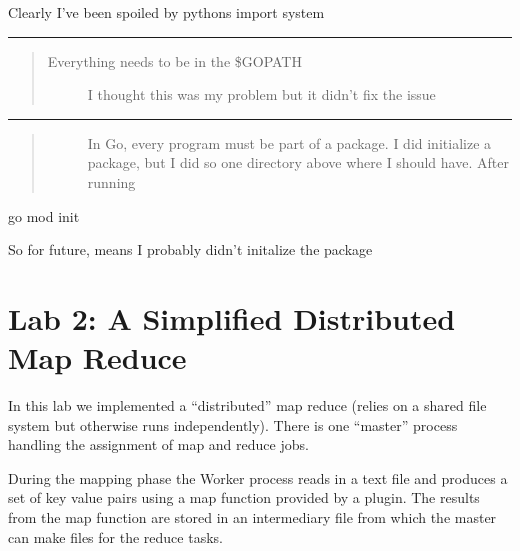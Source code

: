 \documentclass[letterpaper,10pt,english]{sphinxmanual}
\begin{document}
Clearly I’ve been spoiled by pythons import system


\bigskip\hrule\bigskip

\begin{quote}\begin{description}
\item[{Everything needs to be in the \$GOPATH}] \leavevmode
I thought this was my problem but it didn’t fix the issue

\end{description}\end{quote}


\bigskip\hrule\bigskip

\begin{quote}\begin{description}
\item[{}] \leavevmode
In Go,  every program must be part of a package. I did initialize a package, but I
did so one directory above where I should have. After running

\end{description}\end{quote}
\def\sphinxLiteralBlockLabel{\label{\detokenize{grpc/grpc:id4}}}
\begin{sphinxVerbatim}[commandchars=\\\{\}]
\PYGZdl{} go mod init
\end{sphinxVerbatim}

So for future,  means I probably didn’t initalize the package


\chapter{Lab 2: A Simplified Distributed Map Reduce}
\label{\detokenize{labs/lab2:lab-2-a-simplified-distributed-map-reduce}}\label{\detokenize{labs/lab2::doc}}
In this lab we implemented a “distributed” map reduce
(relies on a shared file system but otherwise runs independently).
There is one “master” process handling the assignment of map and reduce jobs.

During the mapping phase the Worker
process reads in a text file and produces a
set of key value pairs using a map function provided by
a plug\sphinxhyphen{}in. The results from the map function are stored in an intermediary
file from which the master can make files for the reduce tasks.
\end{document}
